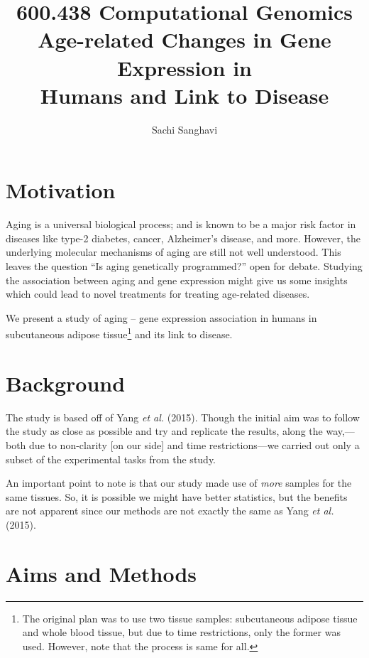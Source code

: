 \documentclass[11pt, oneside]{article}   	%
\title{600.438 Computational Genomics \\ Age-related Changes in Gene Expression in \\ Humans and Link to Disease}
\author{Sachi Sanghavi}
\begin{document}
\maketitle

\section{Motivation}

Aging is a universal biological process; and is known to be a major risk factor in diseases like type-2 diabetes, cancer, Alzheimer's disease, and more. However, the underlying molecular mechanisms of aging are still not well understood. This leaves the question ``Is aging genetically programmed?'' open for debate. Studying the association between aging and gene expression might give us some insights which could lead to novel treatments for treating age-related diseases.

We present a study of aging -- gene expression association in humans in subcutaneous adipose tissue\footnote{The original plan was to use two tissue samples: subcutaneous adipose tissue and whole blood tissue, but due to time restrictions, only the former was used. However, note that the process is same for all.} and its link to disease.

\section{Background}

The study is based off of Yang \emph{et al.} (2015). Though the initial aim was to follow the study as close as possible and try and replicate the results, along the way,---both due to non-clarity [on our side] and time restrictions---we carried out only a subset of the experimental tasks from the study.

An important point to note is that our study made use of \emph{more} samples for the same tissues. So, it is possible we might have better statistics, but the benefits are not apparent since our methods are not exactly the same as Yang \emph{et al.} (2015).

\section{Aims and Methods}
\end{document}
